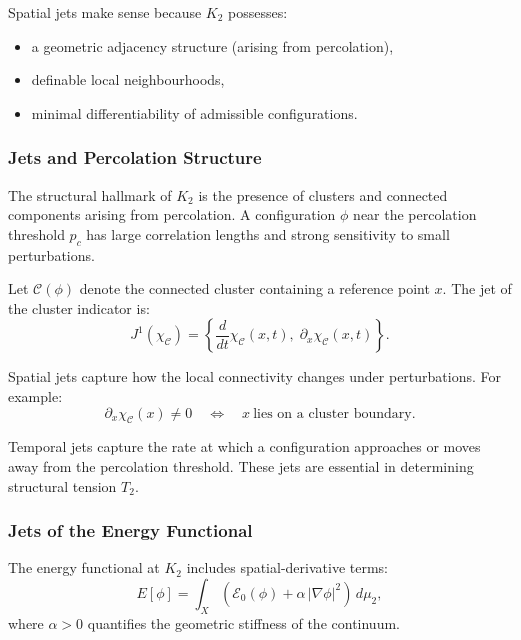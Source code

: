 Spatial jets make sense because $K_2$ possesses:

\begin{itemize}
    \item a geometric adjacency structure (arising from percolation),
    \item definable local neighbourhoods,
    \item minimal differentiability of admissible configurations.
\end{itemize}



\subsubsection{Jets and Percolation Structure}

The structural hallmark of $K_2$ is the presence of clusters and
connected components arising from percolation. A configuration $\phi$
near the percolation threshold $p_c$ has large correlation lengths and
strong sensitivity to small perturbations.

Let $\mathcal{C}(\phi)$ denote the connected cluster containing a
reference point $x$. The jet of the cluster indicator is:
\[
J^1(\chi_{\mathcal{C}}) =
\left\{
\frac{d}{dt}\chi_{\mathcal{C}}(x,t),\;
\partial_x \chi_{\mathcal{C}}(x,t)
\right\}.
\]

Spatial jets capture how the local connectivity changes under
perturbations. For example:
\[
\partial_x \chi_{\mathcal{C}}(x) \neq 0
\quad\Longleftrightarrow\quad
x\ \text{lies on a cluster boundary}.
\]

Temporal jets capture the rate at which a configuration approaches or
moves away from the percolation threshold. These jets are essential in
determining structural tension $T_2$.



\subsubsection{Jets of the Energy Functional}

The energy functional at $K_2$ includes spatial-derivative terms:
\[
E[\phi] = \int_X
\left(
\mathcal{E}_0(\phi)
+ \alpha\, |\nabla \phi|^2
\right)\, d\mu_2,
\]
where $\alpha>0$ quantifies the geometric stiffness of the continuum.

